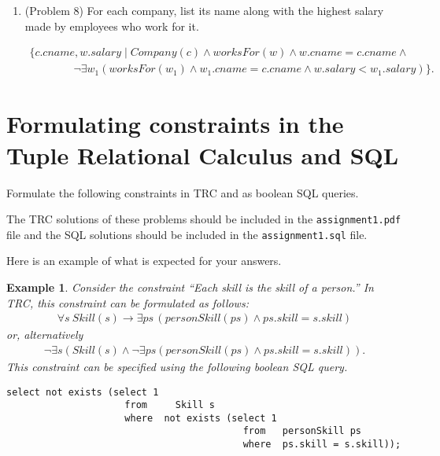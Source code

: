 \documentclass{article}
\newtheorem{example}{Example}
\begin{document}
\begin{enumerate}[resume]
\item (Problem 8) For each company, list its name along with the highest salary made by employees who work for it.

$$
\begin{array}{l}
\{c.cname, w.salary\mid Company (c)\land worksFor(w) \land w.cname = c.cname \land \\
\qquad\qquad   \lnot \exists w_1 (worksFor(w_1) \land w_1.cname = c.cname \land w.salary < w_1.salary)\}.
\end{array}
$$

\end{enumerate}
\newpage

\section{Formulating constraints in the Tuple Relational Calculus and SQL}

Formulate the following constraints in TRC and as boolean SQL queries.   

The TRC solutions of these problems should be included in the {\tt assignment1.pdf} file and
the SQL solutions should be included in the {\tt assignment1.sql} file.

Here is an example of what is expected for your answers.



\begin{example}
Consider the constraint ``\emph{Each skill is the skill of a person.}''
In TRC, this constraint can be formulated as follows:
$$
\begin{array}{l}
\forall s\ Skill(s) \rightarrow \exists ps\, (personSkill(ps) \land ps.skill = s.skill)
\end{array}
$$
or, alternatively
$$
\begin{array}{l}
\lnot \exists s (Skill(s) \land \lnot \exists ps (personSkill(ps) \land ps.skill = s.skill)).
\end{array}
$$
This constraint can be specified using the following boolean SQL query.
\begin{verbatim}
select not exists (select 1
      	      	     from	  Skill	s
      	      	     where  not exists (select 1
      	      	      	      	          from   personSkill ps
      	      	      	      	          where  ps.skill = s.skill));
\end{verbatim}

\end{example}
\end{document}
